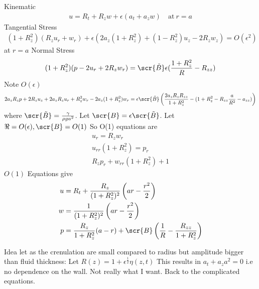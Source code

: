 \documentclass[12pt]{article}
\begin{document}
Kinematic
\begin{align}
u = R_t +R_z w+\epsilon(a_t +a_z w) \quad \mathrm{at}\: r= a
\end{align}
Tangential Stress
\begin{align}
(1+R_z^2)(R_zu_r+w_r) +\epsilon(2a_z(1+R_z^2) + (1-R_z^2)u_z-2R_zw_z) =O(\epsilon^2)
\end{align}
at $r=a$
Normal Stress
\begin{align}
(1+R_z^2) (p-2u_r+2R_zw_r) = \scr{\tilde{B}} \epsilon(\frac{1 + R_z^2}{R} - R_{zz})
\end{align}
Note $O(\epsilon)$
\begin{align}
2a_zR_zp+2R_z u_z+2a_zR_zu_r+R_z^2w_r-2a_z(1+R_z^2)w_r=\epsilon \scr{\tilde B}\left(\frac{2a_zR_zR_{zz}}{1+R_z^2}-(1+R_z^2 - R_{zz}\frac{a}{R^2}-a_{zz})\right)\end{align}
where $\scr{\tilde B}= \frac{\gamma}{\rho g a^2}$. Let $\scr{B} = \epsilon \scr{\tilde{B}}$. Let $\Re= O(\epsilon), \scr{B} = O(1) $
So O(1) equations are
\begin{align}
u_r=R_z w_r \\
u_{rr}(1+R_z^2) = p_r \\
R_zp_r+w_{rr}(1+R_z^2) + 1 
\end{align}
$O(1)$ Equations give
\begin{align}
u &= R_t+ \frac{R_z}{(1+R_z^2)^2 }\left(ar-\frac{r^2}{2}\right)\\
w& =  \frac{1}{(1+R_z^2)^2 }\left(ar-\frac{r^2}{2}\right)\\
p & = \frac{R_z}{1+R_z^2}(a-r)+ \scr{B}\left(\frac{1}{R} - \frac{R_{zz}}{1+R_z^2}\right)
\end{align}

Idea let as the crenulation are small compared to radius but amplitude bigger than fluid thickness: Let $R(z) = 1+ \epsilon^{\frac{1}{2}} \eta(z,t)$
This results in $a_t + a_z a^2 = 0$ i.e no dependence on the wall. Not really what I want. Back to the complicated equations.
\end{document}
